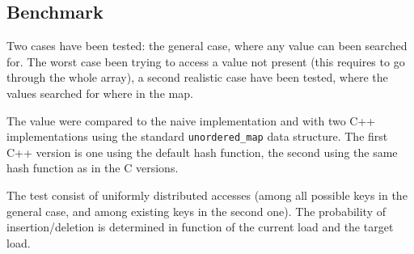 \documentclass[oneside]{article}
\newcommand{\keyvalue}[2] {
	\begin{tabular}{| p{0.8cm} | p{1.3cm} |}
			\hline
			\texttt{#1} & \texttt{#2} \\
			\hline
		\end{tabular}
}
\begin{document}
\begin{example}
	\label{expl:double_h_impl}
	\begin{center}
	\end{center}
\end{example}
\subsection{Benchmark}
Two cases have been tested: the general case, where any value can been searched for. The worst case been trying to access a value not present (this requires to go through the whole array), a second realistic case have been tested, where the values searched for where in the map. 

The value were compared to the naive implementation and with two C++ implementations using the standard \texttt{unordered\_map} data structure. The first C++ version is one using the default hash function, the second using the same hash function as in the C versions.

The test consist of uniformly distributed accesses (among all possible keys in the general case, and among existing keys in the second one). The probability of insertion/deletion is determined in function of the current load and the target load.
\end{document}
